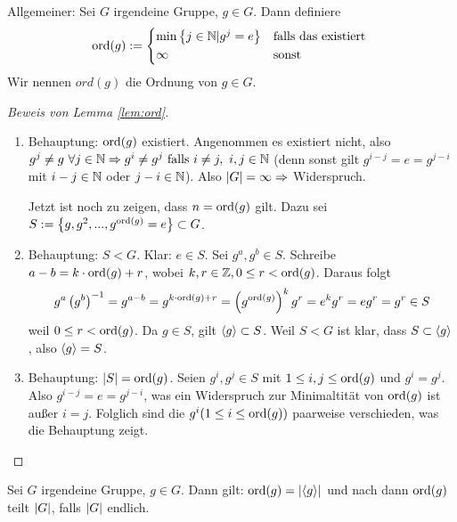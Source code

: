 \documentclass[12pt,a4paper]{scrartcl}
\begin{document}
\begin{defi}
	Allgemeiner: Sei $G$ irgendeine Gruppe, $g \in G$. Dann definiere \begin{equation*}
		\ord(g) := \begin{cases*}
		\min \left\lbrace j \in \IN | g^j = e\right\rbrace &falls das existiert \\
		\infty &sonst
		\end{cases*}
	\end{equation*}
	Wir nennen $ord(g)$ die Ordnung von $g \in G$.
\end{defi}

\begin{proof} [Beweis von Lemma \ref{lem:ord}]
	\begin{enumerate}
	\item Behauptung: $\operatorname{ord}(g)$ existiert. Angenommen es existiert nicht, also 
	$
		g^j \not = g ~ \forall j \in \mathbb N \Rightarrow g^i \neq g^j \text{ falls } i \neq j, ~ i,j \in \mathbb N 
	$
	(denn sonst gilt $g^{i-j}=e=g^{j-i}$ mit $i-j \in \mathbb N$ oder $j-i \in \mathbb N$).
	Also $\lvert G\rvert = \infty \Rightarrow$ Widerspruch.
	
	Jetzt ist noch zu zeigen, dass $n = \operatorname{ord}(g)$ gilt. Dazu sei $S := \left\lbrace g, g^2, ..., g^{\operatorname{ord}(g)} = e \right\rbrace \subset G$.
	
	\item Behauptung: $S < G$. Klar: $e \in S$. Sei $g^a, g^b \in S$. Schreibe $a-b = k \cdot \operatorname{ord}(g) + r$, wobei $k, r \in \mathbb Z, 0 \leq r < \operatorname{ord}(g)$. Daraus folgt
	\begin{equation*}
		g^a\left( g^b \right)^{-1}=g^{a-b}=g^{k \cdot \operatorname{ord}(g)+r}
		= \left(g^{\operatorname{ord}(g)} \right)^kg^r = e^kg^r=eg^r=g^r \in S
	\end{equation*}
	weil $0 \leq r < \operatorname{ord}(g)$.
	Da $g \in S$, gilt $\langle g\rangle\subset S$. Weil $S < G$ ist klar, dass $S \subset \langle g\rangle$, also $\langle g\rangle = S$.
	\item Behauptung: $\lvert S\rvert = \operatorname{ord}(g)$. Seien $g^i, g^j \in S$ mit $1 \leq i,j \leq \operatorname{ord}(g)$ und $g^i=g^j$. Also $g^{i-j} = e = g^{j-i}$, was ein Widerspruch zur Minimaltität von $\operatorname{ord}(g)$ ist außer $i=j$. Folglich sind die $g^i (1\leq i \leq \operatorname{ord}(g))$ paarweise verschieden, was die Behauptung zeigt.
	\end{enumerate}
\end{proof}

\begin{bem}
	Sei $G$ irgendeine Gruppe, $g\in G$. Dann gilt: $\operatorname{ord}(g) = \lvert\langle g\rangle\rvert$ und nach  dann $\operatorname{ord}(g)$ teilt $\lvert G\rvert$, falls $\lvert G\rvert$ endlich.
\end{bem}
\end{document}
